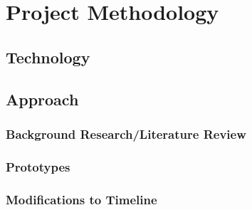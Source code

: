 \chapter{Project Methodology}
\label{method}

\section{Technology}

\section{Approach}

\subsection{Background Research/Literature Review}

\subsection{Prototypes}

\subsection{Modifications to Timeline}
